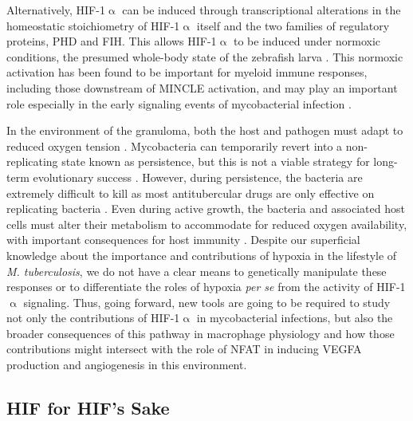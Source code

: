 Alternatively, HIF\hyp{}1$\upalpha$ can be induced through transcriptional alterations in the homeostatic stoichiometry of HIF\hyp{}1$\upalpha$ itself and the two families of regulatory proteins, PHD and FIH. This allows HIF\hyp{}1$\upalpha$ to be induced under normoxic conditions, the presumed whole\hyp{}body state of the zebrafish larva \citep{Ellertsdottir2010}. This normoxic activation has been found to be important for myeloid immune responses, including those downstream of MINCLE activation, and may play an important role especially in the early signaling events of mycobacterial infection \citep{Nishi2008, Schatz2016, Schoenen2014, Thompson2017}. 

In the environment of the granuloma, both the host and pathogen must adapt to reduced oxygen tension \citep{Prosser2017}. Mycobacteria can temporarily revert into a non\hyp{}replicating state known as persistence, but this is not a viable strategy for long\hyp{}term evolutionary success \citep{Ehrt2018, Stewart2003, Manabe2000, Pandey2008, zuBentrup2001}. However, during persistence, the bacteria are extremely difficult to kill as most antitubercular drugs are only effective on replicating bacteria \citep{Veatch2018}. Even during active growth, the bacteria and associated host cells must alter their metabolism to accommodate for reduced oxygen availability, with important consequences for host immunity \citep{Harper2012, Tsai2006, Prosser2017, Rustad2009, Galagan2013}. Despite our superficial knowledge about the importance and contributions of hypoxia in the lifestyle of \textit{M. tuberculosis}, we do not have a clear means to genetically manipulate these responses or to differentiate the roles of hypoxia \textit{per se} from the activity of HIF\hyp{}1$\upalpha$ signaling. Thus, going forward, new tools are going to be required to study not only the contributions of HIF\hyp{}1$\upalpha$ in mycobacterial infections, but also the broader consequences of this pathway in macrophage physiology and how those contributions might intersect with the role of NFAT in inducing VEGFA production and angiogenesis in this environment.

\subsection{HIF for HIF's Sake}\label{hif4hif}

